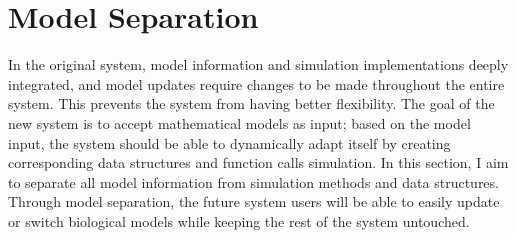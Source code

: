 \documentclass[../thesis.tex]{subfiles}
\begin{document}
\chapter{Model Separation}
\label{ch:specific1}
In the original system, model information and simulation implementations deeply integrated, and model updates require changes to be made throughout the entire system. This prevents the system from having better flexibility. The goal of the new system is to accept mathematical models as input; based on the model input, the system should be able to dynamically adapt itself by creating corresponding data structures and function calls simulation. In this section, I aim to separate all model information from simulation methods and data structures. Through model separation, the future system users will be able to easily update or switch biological models while keeping the rest of the system untouched. 
\end{document}
